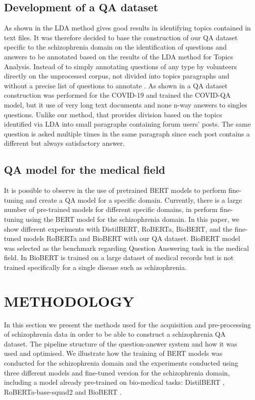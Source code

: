 \documentclass[runningheads]{llncs}
\begin{document}
\subsection{Development of a QA dataset}
As shown in \cite{c15,c16,c17,c18} the LDA method gives good results in identifying topics contained in text files. It was therefore decided to base the construction of our QA dataset specific to the schizophrenia domain on the identification of questions and answers to be annotated based on the results of the LDA method for Topics Analysis. Instead of to simply annotating questions of any type by volunteers directly on the unprocessed corpus, not divided into topics paragraphs and without a precise list of questions to annotate \cite{c32}. 
As shown in \cite{c33} a QA dataset construction was performed for the COVID-19 and trained the COVID-QA model, but it use of very long text documents and none n-way answers to singles questions. Unlike our method, that provides division based on the topics identified via LDA into small paragraphs containing forum users' posts. The same question is asked multiple times in the same paragraph since each post contains a different but always satisfactory answer.

\subsection{QA model for the medical field}
It is possible to observe in \cite{c11,c2,c13,c14} the use of pretrained BERT models to perform fine-tuning and create a QA model for a specific domain. Currently, there is a large number of pre-trained models for different specific domains, in \cite{c36,c37} perform fine-tuning using the BERT model for the schizophrenia domain. In this paper, we show different experiments with DistilBERT, RoBERTa, BioBERT, and the fine-tuned models RoBERTa and BioBERT with our QA dataset\cite{c39}. 
BioBERT model was selected as the benchmark regarding Question Answering task in the medical field. In \cite{c39} BioBERT is trained on a large dataset of medical records but is not trained specifically for a single disease such as schizophrenia.


\section{METHODOLOGY} 
In this section we present the methods used for the acquisition and pre-processing of schizophrenia data in order to be able to construct a schizophrenia QA dataset. The pipeline structure of the question-answer system and how it was used and optimised. We illustrate how the training of BERT models was conducted for the schizophrenia domain and the experiments conducted using three different models and fine-tuned version for the schizophrenia domain, including a model already pre-trained on bio-medical tasks: DistilBERT \cite{c29}, RoBERTa-base-squad2 \cite{c24} and BioBERT \cite{c39}. 
\end{document}
